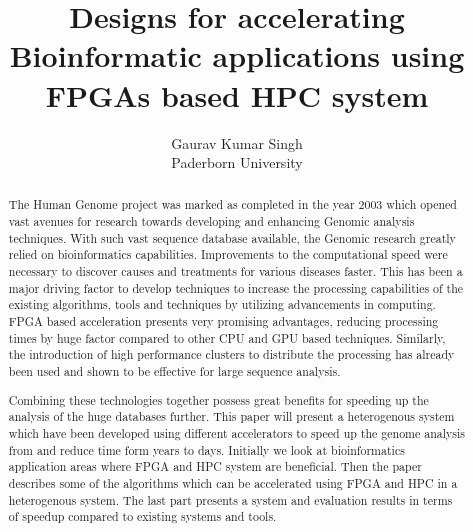 \documentclass[12pt,twoside]{article}
\newcommand{\participant}{Gaurav Kumar Singh}
\newcommand{\affiliation}{Paderborn University}
\newcommand{\topic}{Designs for accelerating Bioinformatic applications using FPGAs based HPC system}
\begin{document}
\title{\topic}
\author{\Large{\participant}\\ \affiliation \\ {\small \emailaddress}}
\date{}
\maketitle
\thispagestyle{empty}


\begin{abstract}

 The Human Genome project was marked as completed in the year 2003 which opened vast avenues 
 for research towards developing and enhancing Genomic analysis techniques. With such vast sequence
 database available, the Genomic research greatly relied on bioinformatics capabilities. Improvements
 to the computational speed were necessary to discover causes and treatments for various
 diseases faster. This has been a major driving factor to develop techniques to increase the processing
 capabilities of the existing algorithms, tools and techniques by utilizing advancements in computing.
 FPGA based acceleration presents very promising advantages, reducing processing times
 by huge factor compared to other CPU and GPU based techniques. Similarly, the introduction of high performance
 clusters to distribute the processing has already been used and shown to be effective for large sequence analysis.

 Combining these technologies together possess great benefits for speeding up the analysis of the huge databases further.
 This paper will present a heterogenous system which have been developed using different accelerators to
 speed up the genome analysis from and reduce time form years to days. Initially we look at bioinformatics application
 areas where  FPGA and HPC system are beneficial. Then the paper describes some of the algorithms which can be accelerated
 using FPGA and HPC in a heterogenous system. The last part presents a system and evaluation
 results in terms of speedup compared to existing systems and tools.

\end{abstract}

\end{document}
